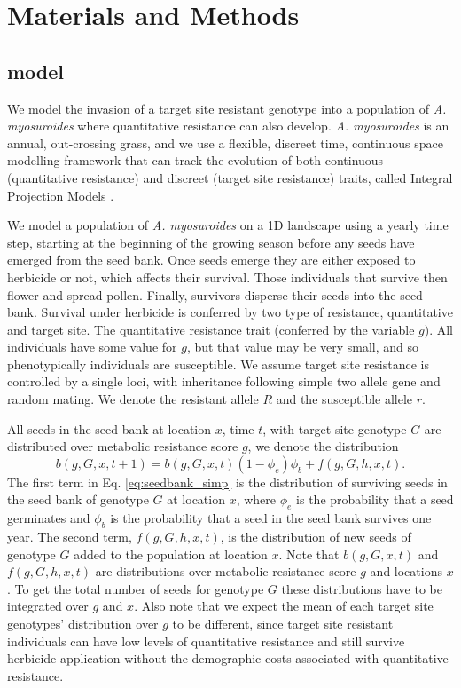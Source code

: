 \documentclass[10pt,letterpaper]{article}
\begin{document}
\section*{Materials and Methods}
\subsection*{model}
We model the invasion of a target site resistant genotype into a population of \textit{A. myosuroides} where quantitative resistance can also develop. \textit{A. myosuroides} is an annual, out-crossing grass, and we use a flexible, discreet time, continuous space modelling framework that can track the evolution of both continuous (quantitative resistance) and discreet (target site resistance) traits, called Integral Projection Models \cite{Elln2006}.     

We model a population of \textit{A. myosuroides} on a 1D landscape using a yearly time step, starting at the beginning of the growing season before any seeds have emerged from the seed bank. Once seeds emerge they are either exposed to herbicide or not, which affects their survival. Those individuals that survive then flower and spread pollen. Finally, survivors disperse their seeds into the seed bank. Survival under herbicide is conferred by two type of resistance, quantitative and target site. The quantitative resistance trait (conferred by the variable $g$). All individuals have some value for $g$, but that value may be very small, and so phenotypically individuals are susceptible. We assume target site resistance is controlled by a single loci, with inheritance following simple two allele gene and random mating. We denote the resistant allele $R$ and the susceptible allele $r$. 

All seeds in the seed bank at location $x$, time $t$, with target site genotype $G$ are distributed over metabolic resistance score $g$, we denote the distribution  
\begin{equation}\label{eq:seedbank_simp}
	b(g, G, x, t + 1) = b(g, G, x, t)(1 - \phi_e)\phi_b + f(g, G, h, x, t). 
\end{equation}
The first term in Eq. \ref{eq:seedbank_simp} is the distribution of surviving seeds in the seed bank of genotype $G$ at location $x$, where $\phi_e$ is the probability that a seed germinates and $\phi_b$ is the probability that a seed in the seed bank survives one year. The second term, $f(g, G, h, x, t)$, is the distribution of new seeds of genotype $G$ added to the population at location $x$. Note that $b(g, G, x, t)$ and $f(g, G, h, x, t)$ are distributions over metabolic resistance score $g$ and locations $x$. To get the total number of seeds for genotype $G$ these distributions have to be integrated over $g$ and $x$. Also note that we expect the mean of each target site genotypes' distribution over $g$ to be different, since target site resistant individuals can have low levels of quantitative resistance and still survive herbicide application without the demographic costs associated with quantitative resistance. 
\end{document}
